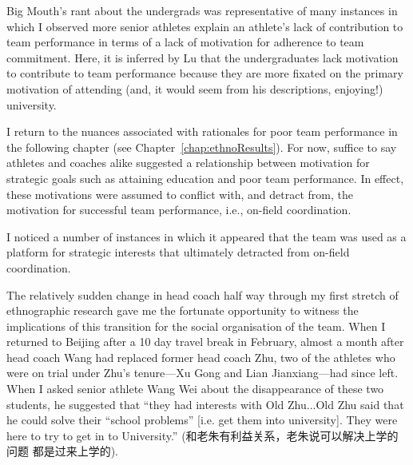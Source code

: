 \begin{CJK}{UTF8}{gbsn}
Big Mouth's rant about the undergrads was representative of many instances in which I observed more senior athletes explain an athlete's lack of contribution to team performance in terms of a lack of motivation for adherence to team commitment.  Here, it is inferred by Lu that the undergraduates lack motivation to contribute to team performance because they are more fixated on the primary motivation of attending (and, it would seem from his descriptions, enjoying!) university.

I return to the nuances associated with rationales for poor team performance in the following chapter (see Chapter~\ref{chap:ethnoResults}).  For now, suffice to say athletes and coaches alike suggested a relationship between motivation for strategic goals such as attaining education and poor team performance.  In effect, these motivations were assumed to conflict with, and detract from, the motivation for successful team performance, i.e., on-field coordination.












I noticed a number of instances in which it appeared that the team was used as a platform for strategic interests that ultimately detracted from on-field coordination.

The relatively sudden change in head coach half way through my first stretch of ethnographic research gave me the fortunate opportunity to witness the implications of this transition for the social organisation of the team.  When I returned to Beijing after a 10 day travel break in February, almost a month after head coach Wang had replaced former head coach Zhu, two of the athletes who were on trial under Zhu's tenure---Xu Gong and Lian Jianxiang---had since left.  When I asked senior athlete Wang Wei about the disappearance of these two students, he suggested that ``they had interests with Old Zhu...Old Zhu said that he could solve their ``school problems'' [i.e. get them into university]. They were here to try to get in to University.'' (和老朱有利益关系，老朱说可以解决上学的问题 都是过来上学的).


\end{CJK}
